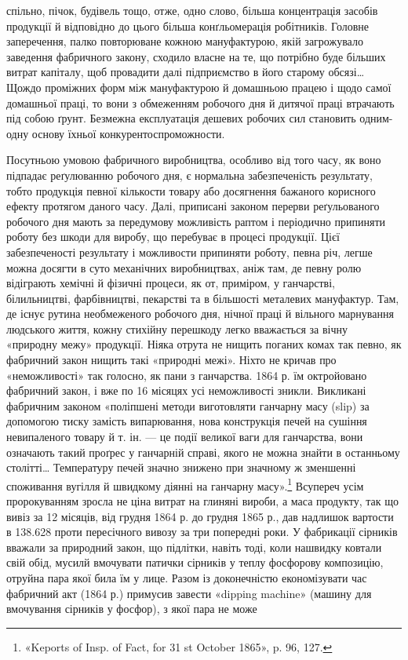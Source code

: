 \parcont{}  %
спільно, пічок, будівель тощо, отже, одно слово, більша концентрація
засобів продукції й відповідно до цього більша конґльомерація
робітників. Головне заперечення, палко повторюване
кожною мануфактурою, якій загрожувало заведення фабричного
закону, сходило власне на те, що потрібно буде більших витрат
капіталу, щоб провадити далі підприємство в його старому обсязі\dots{}
Щождо проміжних форм між мануфактурою й домашньою працею
і щодо самої домашньої праці, то вони з обмеженням робочого
дня й дитячої праці втрачають під собою ґрунт. Безмежна експлуатація
дешевих робочих сил становить одним-одну основу їхньої
конкурентоспроможности.

Посутньою умовою фабричного виробництва, особливо від того
часу, як воно підпадає реґулюванню робочого дня, є нормальна
забезпеченість результату, тобто продукція певної кількости товару
або досягнення бажаного корисного ефекту протягом даного
часу. Далі, приписані законом перерви реґульованого робочого
дня мають за передумову можливість раптом і періодично припиняти
роботу без шкоди для виробу, що перебуває в процесі продукції.
Цієї забезпеченості результату і можливости припиняти
роботу, певна річ, легше можна досягти в суто механічних виробництвах,
аніж там, де певну ролю відіграють хемічні й фізичні
процеси, як от, приміром, у ганчарстві, білильництві, фарбівництві,
пекарстві та в більшості металевих мануфактур. Там, де
існує рутина необмеженого робочого дня, нічної праці й вільного
марнування людського життя, кожну стихійну перешкоду легко
вважається за вічну «природну межу» продукції. Ніяка отрута
не нищить поганих комах так певно, як фабричний закон нищить
такі «природні межі». Ніхто не кричав про «неможливості» так
голосно, як пани з ганчарства. 1864 р. їм октройовано фабричний
закон, і вже по 16 місяцях усі неможливості зникли. Викликані
фабричним законом «поліпшені методи виготовляти ганчарну
масу (slip) за допомогою тиску замість випарювання, нова конструкція
печей на сушіння невипаленого товару й т. ін. — це
події великої ваги для ганчарства, вони означають такий проґрес
у ганчарній справі, якого не можна знайти в останньому столітті\dots{}
Температуру печей значно знижено при значному ж зменшенні
споживання вугілля й швидкому діянні на ганчарну масу».\footnote{
«Keports of Insp. of Fact, for 31 st October 1865», p. 96, 127.
}
Всупереч усім пророкуванням зросла не ціна витрат на глиняні
вироби, а маса продукту, так що вивіз за 12 місяців, від грудня
1864 р. до грудня 1865 р., дав надлишок вартости в 138.628 проти пересічного вивозу за три попередні роки. У фабрикації
сірників вважали за природний закон, що підлітки,
навіть тоді, коли нашвидку ковтали свій обід, мусилй вмочувати
патички сірників у теплу фосфорову композицію, отруйна пара
якої била їм у лице. Разом із доконечністю економізувати час
фабричний акт (1864 р.) примусив завести «dipping machine»
(машину для вмочування сірників у фосфор), з якої пара не може
\parbreak{}  %
